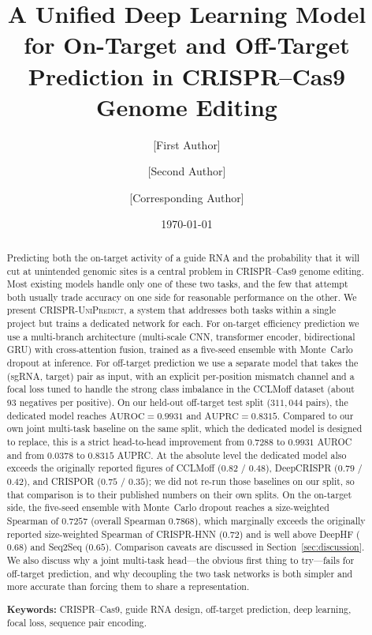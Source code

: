 \documentclass[11pt,a4paper]{article}
\title{\Large\bfseries A Unified Deep Learning Model for On-Target and Off-Target Prediction in CRISPR--Cas9 Genome Editing}
\author[1]{[First Author]}
\author[1]{[Second Author]}
\author[1,*]{[Corresponding Author]}
\affil[1]{[Department, Institution, City, Country]}
\affil[*]{Correspondence: \texttt{[email@institution]}}
\date{\today}
\begin{document}
\maketitle

\begin{abstract}
\noindent
Predicting both the on-target activity of a guide RNA and the probability that it will cut at unintended genomic sites is a central problem in CRISPR--Cas9 genome editing. Most existing models handle only one of these two tasks, and the few that attempt both usually trade accuracy on one side for reasonable performance on the other. We present \textsc{CRISPR-UniPredict}, a system that addresses both tasks within a single project but trains a dedicated network for each. For on-target efficiency prediction we use a multi-branch architecture (multi-scale CNN, transformer encoder, bidirectional GRU) with cross-attention fusion, trained as a five-seed ensemble with Monte~Carlo dropout at inference. For off-target prediction we use a separate model that takes the (sgRNA, target) pair as input, with an explicit per-position mismatch channel and a focal loss tuned to handle the strong class imbalance in the CCLMoff dataset (about 93 negatives per positive). On our held-out off-target test split ($311{,}044$ pairs), the dedicated model reaches $\mathrm{AUROC}=0.9931$ and $\mathrm{AUPRC}=0.8315$. Compared to our own joint multi-task baseline on the same split, which the dedicated model is designed to replace, this is a strict head-to-head improvement from $0.7288$ to $0.9931$ AUROC and from $0.0378$ to $0.8315$ AUPRC. At the absolute level the dedicated model also exceeds the originally reported figures of CCLMoff ($0.82$ / $0.48$), DeepCRISPR ($0.79$ / $0.42$), and CRISPOR ($0.75$ / $0.35$); we did not re-run those baselines on our split, so that comparison is to their published numbers on their own splits. On the on-target side, the five-seed ensemble with Monte~Carlo dropout reaches a size-weighted Spearman of $0.7257$ (overall Spearman $0.7868$), which marginally exceeds the originally reported size-weighted Spearman of CRISPR-HNN ($0.72$) and is well above DeepHF ($0.68$) and Seq2Seq ($0.65$). Comparison caveats are discussed in Section~\ref{sec:discussion}. We also discuss why a joint multi-task head---the obvious first thing to try---fails for off-target prediction, and why decoupling the two task networks is both simpler and more accurate than forcing them to share a representation.
\vspace{4pt}

\noindent\textbf{Keywords:} CRISPR--Cas9, guide RNA design, off-target prediction, deep learning, focal loss, sequence pair encoding.
\end{abstract}
\end{document}
